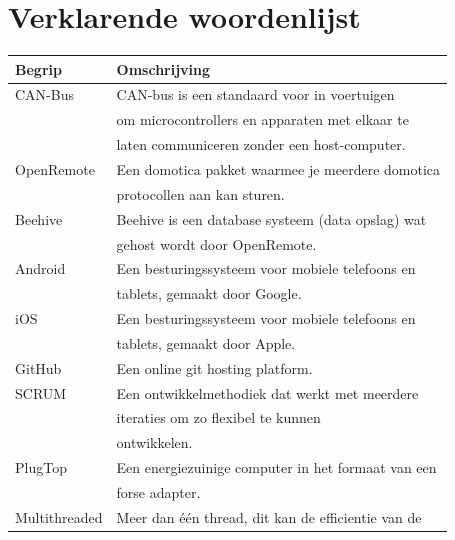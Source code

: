 \documentclass[]{article}
\begin{document}
\newpage
\section{Verklarende woordenlijst}

\begin{tabular}{|| l | l ||}\hline
    Begrip           & Omschrijving                                         \\\hline\hline
    CAN-Bus          & CAN-bus is een standaard voor in voertuigen          \\
                     & om microcontrollers en apparaten met elkaar te       \\
                     & laten communiceren zonder een host-computer.         \\\hline
    OpenRemote       & Een domotica pakket waarmee je meerdere domotica     \\
                     & protocollen aan kan sturen.                          \\\hline
    Beehive          & Beehive is een database systeem (data opslag) wat    \\
                     & gehost wordt door OpenRemote.                        \\\hline
    Android          & Een besturingssysteem voor mobiele telefoons en      \\
                     & tablets, gemaakt door Google.                        \\\hline
    iOS              & Een besturingssysteem voor mobiele telefoons en      \\
                     & tablets, gemaakt door Apple.                         \\\hline
    GitHub           & Een online git hosting platform.                     \\\hline
    SCRUM            & Een ontwikkelmethodiek dat werkt met meerdere        \\
                     & iteraties om zo flexibel te kunnen                   \\
                     & ontwikkelen.                                         \\\hline
    PlugTop          & Een energiezuinige computer in het formaat van een   \\
                     & forse adapter.                                       \\\hline
    Multithreaded    & Meer dan \'e\'en thread, dit kan de efficientie van de   \\

\end{tabular}
\end{document}
